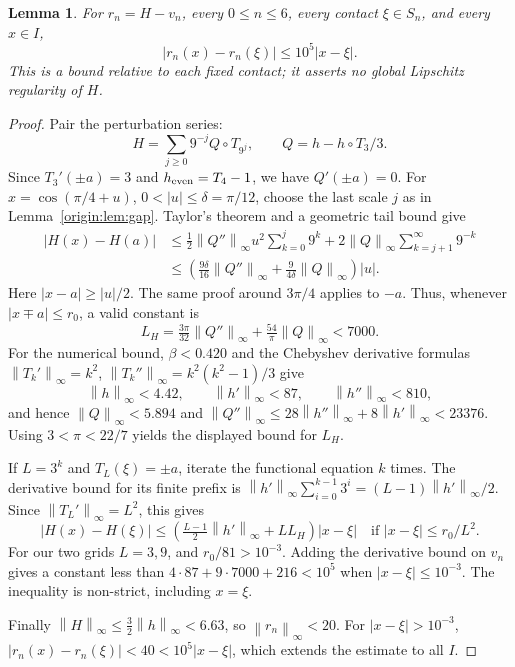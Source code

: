 \documentclass[11pt]{article}
\newtheorem{lemma}[theorem]{Lemma}
\theoremstyle{remark}\newtheorem{remark}[theorem]{Remark}
\newcommand{\norm}[1]{\left\lVert #1\right\rVert_\infty}
\begin{document}
\begin{lemma}\label{origin:lem:lip}
For $r_n=H-v_n$, every $0\le n\le6$, every contact $\xi\in S_n$, and
every $x\in I$,
\[
 |r_n(x)-r_n(\xi)|\le 10^5|x-\xi|.
\]
This is a bound relative to each fixed contact; it asserts no global
Lipschitz regularity of $H$.
\end{lemma}
\begin{proof}
Pair the perturbation series:
\[
 H=\sum_{j\ge0}9^{-j}Q\circ T_{9^j},\qquad Q=h-h\circ T_3/3.
\]
Since $T_3'(\pm a)=3$ and $h_{\rm even}=T_4-1$, we have
$Q'(\pm a)=0$. For $x=\cos(\pi/4+u)$, $0<|u|\le\delta=\pi/12$,
choose the last scale $j$ as in Lemma~\ref{origin:lem:gap}. Taylor's theorem and a
geometric tail bound give
\begin{align*}
 |H(x)-H(a)|
 &\le \tfrac12\norm{Q''}u^2\sum_{k=0}^{j}9^k
                  +2\norm Q\sum_{k=j+1}^\infty9^{-k}\\
 &\le \left(\tfrac{9\delta}{16}\norm{Q''}
                  +\tfrac9{4\delta}\norm Q\right)|u|.
\end{align*}
Here $|x-a|\ge|u|/2$. The same proof around $3\pi/4$ applies to $-a$.
Thus, whenever $|x\mp a|\le r_0$, a valid constant is
\[
 L_H=\tfrac{3\pi}{32}\norm{Q''}+\tfrac{54}{\pi}\norm Q<7000.
\]
For the numerical bound, $\beta<0.420$ and the Chebyshev derivative formulas
$\norm{T_k'}=k^2$, $\norm{T_k''}=k^2(k^2-1)/3$ give
\[
 \norm h<4.42,\qquad\norm{h'}<87,\qquad\norm{h''}<810,
\]
and hence $\norm Q<5.894$ and
$\norm{Q''}\le28\norm{h''}+8\norm{h'}<23376$.
Using $3<\pi<22/7$ yields the displayed bound for $L_H$.

If $L=3^k$ and $T_L(\xi)=\pm a$, iterate the functional equation $k$ times.
The derivative bound for its finite prefix is
$\norm{h'}\sum_{i=0}^{k-1}3^i=(L-1)\norm{h'}/2$.
Since $\norm{T_L'}=L^2$, this gives
\[
 |H(x)-H(\xi)|\le\left(\tfrac{L-1}{2}\norm{h'}+LL_H\right)|x-\xi|
 \quad\text{if } |x-\xi|\le r_0/L^2.
\]
For our two grids $L=3,9$, and $r_0/81>10^{-3}$.
Adding the derivative bound on $v_n$ gives a constant less than
$4\cdot87+9\cdot7000+216<10^5$ when $|x-\xi|\le10^{-3}$.
The inequality is non-strict, including $x=\xi$.

Finally $\norm H\le\tfrac32\norm h<6.63$, so $\norm{r_n}<20$.
For $|x-\xi|>10^{-3}$,
$|r_n(x)-r_n(\xi)|<40<10^5|x-\xi|$, which extends the estimate to all $I$.
\end{proof}
\end{document}
